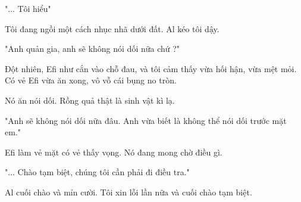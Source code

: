 "... Tôi hiểu"

Tôi đang ngồi một cách nhục nhã dưới đất. Al kéo tôi dậy.

"Anh quản gia, anh sẽ không nói dối nữa chứ ?"

Đột nhiên, Efi như cắn vào chỗ đau, và tôi cảm thấy vừa hối hận, vừa mệt mỏi. Có vẻ Efi vừa ăn xong, vô vỗ cái bụng no tròn.

Nó ăn nói dối. Rồng quả thật là sinh vật kì lạ.

"Anh sẽ không nói dối nữa đâu. Anh vừa biết là không thể nói dối trước mặt em."

Efi làm vẻ mặt có vẻ thấy vọng. Nó đang mong chờ điều gì.

"... Chào tạm biệt, chúng tôi cần phải đi điều tra."

Al cuối chào và mỉn cười. Tôi xin lỗi lần nữa và cuối chào tạm biệt.


